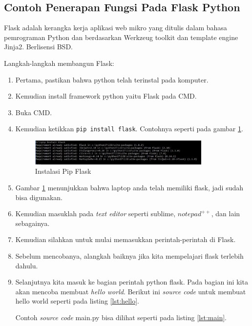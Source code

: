 \subsection{Contoh Penerapan Fungsi Pada Flask Python}

Flask adalah kerangka kerja aplikasi web mikro yang ditulis dalam bahasa pemrograman Python dan berdasarkan Werkzeug toolkit dan template engine Jinja2. Berlisensi BSD.

Langkah-langkah membangun Flask:
\begin{enumerate}
\item Pertama, pastikan bahwa python telah terinstal pada komputer.
\item Kemudian install framework python yaitu Flask pada CMD.
\item Buka CMD.
\item Kemudian ketikkan \verb|pip install flask|. Contohnya seperti pada gambar \ref{fig:install_pip}.
\begin{figure}[!htbp]
	\centerline{\includegraphics[width=0.85\textwidth]{figures/8/install_pip.jpg}}
	\caption{Instalasi Pip Flask}
	\label{fig:install_pip}
\end{figure} 

\item Gambar \ref{fig:install_pip} menunjukkan bahwa laptop anda telah memiliki flask, jadi sudah bisa digunakan.
\item Kemudian masuklah pada \textit{text editor} seperti sublime, $notepad^{++}$, dan lain sebagainya.
\item Kemudian silahkan untuk mulai memasukkan perintah-perintah di Flask.
\item Sebelum mencobanya, alangkah baiknya jika kita mempelajari flask terlebih dahulu.
\item Selanjutnya kita masuk ke bagian perintah python flask. Pada bagian ini kita akan mencoba membuat \textit{hello world}. Berikut ini \textit{source code} untuk membuat hello world seperti pada listing \ref{lst:hello}.


 Contoh \textit{source code} main.py bisa dilihat seperti pada listing \ref{lst:main}.



\end{enumerate}
